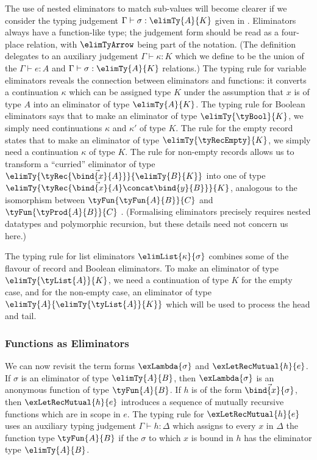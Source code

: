 

The use of nested eliminators to match sub-values will become clearer if we consider the typing judgement $\Gamma \vdash \sigma: \elimTy{A}{K}$ given in . Eliminators always have a function-like type; the judgement form should be read as a four-place relation, with $\elimTyArrow$ being part of the notation. (The definition delegates to an auxiliary judgement $\Gamma \vdash \kappa: K$ which we define to be the union of the $\Gamma \vdash e: A$ and $\Gamma \vdash \sigma: \elimTy{A}{K}$ relations.) The typing rule for variable eliminators reveals the connection between eliminators and functions: it converts a continuation $\kappa$ which can be assigned type $K$ under the assumption that $x$ is of type $A$ into an eliminator of type $\elimTy{A}{K}$. The typing rule for Boolean eliminators says that to make an eliminator of type $\elimTy{\tyBool}{K}$, we simply need continuations $\kappa$ and $\kappa'$ of type $K$. The rule for the empty record states that to make an eliminator of type $\elimTy{\tyRecEmpty}{K}$, we simply need a continuation $\kappa$ of type $K$. The rule for non-empty records allows us to transform a ``curried'' eliminator of type $\elimTy{\tyRec{\vec{\bind{x}{A}}}}{\elimTy{B}{K}}$ into one of type $\elimTy{\tyRec{\vec{\bind{x}{A}} \concat \bind{y}{B}}}{K}$, analogous to the isomorphism between $\tyFun{\tyFun{A}{B}}{C}$ and $\tyFun{\tyProd{A}{B}}{C}$ \cite{hinze00}. (Formalising eliminators precisely requires nested datatypes \cite{bird98} and polymorphic recursion, but these details need not concern us here.)

The typing rule for list eliminators $\elimList{\kappa}{\sigma}$ combines some of the flavour of record and Boolean eliminators. To make an eliminator of type $\elimTy{\tyList{A}}{K}$, we need a continuation of type $K$ for the empty case, and for the non-empty case, an eliminator of type $\elimTy{A}{\elimTy{\tyList{A}}{K}}$ which will be used to process the head and tail.

\subsubsection{Functions as Eliminators}

We can now revisit the term forms $\exLambda{\sigma}$ and $\exLetRecMutual{h}{e}$. If $\sigma$ is an eliminator of type $\elimTy{A}{B}$, then $\exLambda{\sigma}$ is an anonymous function of type $\tyFun{A}{B}$. If $h$ is of the form $\vec{\bind{x}{\sigma}}$, then $\exLetRecMutual{h}{e}$ introduces a sequence of mutually recursive functions which are in scope in $e$. The typing rule for $\exLetRecMutual{h}{e}$ uses an auxiliary typing judgement $\Gamma \vdash h : \Delta$ which assigns to every $x$ in $\Delta$ the function type $\tyFun{A}{B}$ if the $\sigma$ to which $x$ is bound in $h$ has the eliminator type $\elimTy{A}{B}$.

